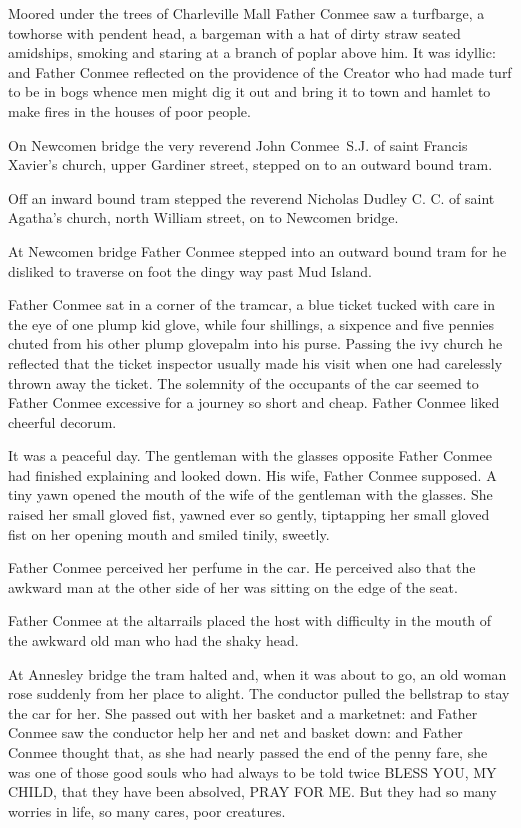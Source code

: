 Moored under the trees of Charleville Mall Father Conmee saw a
turfbarge, a towhorse with pendent head, a bargeman with a hat of dirty
straw seated amidships, smoking and staring at a branch of poplar above
him. It was idyllic: and Father Conmee reflected on the providence of the
Creator who had made turf to be in bogs whence men might dig it out and
bring it to town and hamlet to make fires in the houses of poor people.

On Newcomen bridge the very reverend John Conmee~S.J. of saint
Francis Xavier's church, upper Gardiner street, stepped on to an outward
bound tram.

Off an inward bound tram stepped the reverend Nicholas Dudley
C. C. of saint Agatha's church, north William street, on to Newcomen
bridge.

At Newcomen bridge Father Conmee stepped into an outward bound
tram for he disliked to traverse on foot the dingy way past Mud Island.

Father Conmee sat in a corner of the tramcar, a blue ticket tucked
with care in the eye of one plump kid glove, while four shillings, a
sixpence and five pennies chuted from his other plump glovepalm into his
purse. Passing the ivy church he reflected that the ticket inspector
usually made his visit when one had carelessly thrown away the ticket.
The solemnity of the occupants of the car seemed to Father Conmee
excessive for a journey so short and cheap. Father Conmee liked cheerful
decorum.

It was a peaceful day. The gentleman with the glasses opposite Father
Conmee had finished explaining and looked down. His wife, Father
Conmee supposed. A tiny yawn opened the mouth of the wife of the gentleman
with the glasses. She raised her small gloved fist, yawned ever so gently,
tiptapping  her small gloved fist on her opening mouth and smiled tinily,
sweetly.

Father Conmee perceived her perfume in the car. He perceived also
that the awkward man at the other side of her was sitting on the edge of
the seat.

Father Conmee at the altarrails placed the host with difficulty in the
mouth of the awkward old man who had the shaky head.

At Annesley bridge the tram halted and, when it was about to go, an
old woman rose suddenly from her place to alight. The conductor pulled
the bellstrap to stay the car for her. She passed out with her basket and
a marketnet: and Father Conmee saw the conductor help her and net and
basket down: and Father Conmee thought that, as she had nearly passed
the end of the penny fare, she was one of those good souls who had always
to be told twice BLESS YOU, MY CHILD, that they have been absolved, PRAY
FOR ME. But they had so many worries in life, so many cares, poor
creatures.

